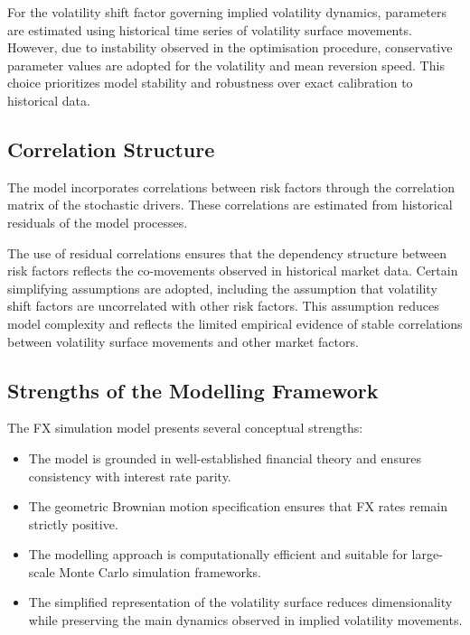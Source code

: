 For the volatility shift factor governing implied volatility dynamics, parameters are estimated using historical time series of volatility surface movements. However, due to instability observed in the optimisation procedure, conservative parameter values are adopted for the volatility and mean reversion speed. This choice prioritizes model stability and robustness over exact calibration to historical data.

\subsection{Correlation Structure}

The model incorporates correlations between risk factors through the correlation matrix of the stochastic drivers. These correlations are estimated from historical residuals of the model processes.

The use of residual correlations ensures that the dependency structure between risk factors reflects the co-movements observed in historical market data. Certain simplifying assumptions are adopted, including the assumption that volatility shift factors are uncorrelated with other risk factors. This assumption reduces model complexity and reflects the limited empirical evidence of stable correlations between volatility surface movements and other market factors.

\subsection{Strengths of the Modelling Framework}

The FX simulation model presents several conceptual strengths:

\begin{itemize}
	
	\item The model is grounded in well-established financial theory and ensures consistency with interest rate parity.
	
	\item The geometric Brownian motion specification ensures that FX rates remain strictly positive.
	
	\item The modelling approach is computationally efficient and suitable for large-scale Monte Carlo simulation frameworks.
	
	\item The simplified representation of the volatility surface reduces dimensionality while preserving the main dynamics observed in implied volatility movements.
	
\end{itemize}

